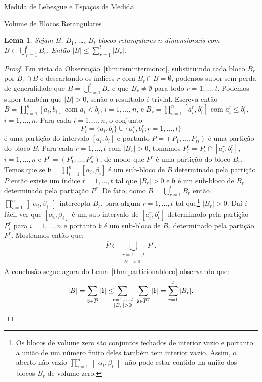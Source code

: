 \documentclass[oneside,final,11pt]{amsbook}
\theoremstyle{remark}\newtheorem{exercise}{Exercício}[chapter]
\theoremstyle{remark}\newtheorem{*exercise}[exercise]{\hbox to 0pt{\hskip 0pt minus 1fil*}Exercício}
\theoremstyle{definition}\newtheorem{exdefin}{Definição}[chapter]
\theoremstyle{plain}\newtheorem{teo}{Teorema}[section]
\theoremstyle{plain}\newtheorem{lem}[teo]{Lema}
\theoremstyle{plain}\newtheorem{prop}[teo]{Proposição}
\theoremstyle{plain}\newtheorem{cor}[teo]{Corolário}
\theoremstyle{definition}\newtheorem{defin}[teo]{Definição}
\theoremstyle{remark}\newtheorem{rem}[teo]{Observação}
\theoremstyle{definition}\newtheorem{notation}[teo]{Notação}
\theoremstyle{definition}\newtheorem{convention}[teo]{Convenção}
\theoremstyle{definition}\newtheorem{example}[teo]{Exemplo}
\numberwithin{section}{chapter}
\numberwithin{equation}{section}
\begin{document}
\begin{chapter}{Medida de Lebesgue e Espaços de Medida}
\begin{section}{Volume de Blocos Retangulares}
\begin{lem}\label{thm:dificilvolblocos}
Sejam $B$, $B_1$, \ldots, $B_t$ blocos retangulares $n$-dimensionais com $B\subset\bigcup_{r=1}^tB_r$. Então
$\vert B\vert\le\sum_{r=1}^t\vert B_r\vert$.
\end{lem}
\begin{proof}
Em vista da Observação~\ref{thm:remintermonot}, substituindo cada bloco $B_r$ por $B_r\cap B$ e descartando os índices
$r$ com $B_r\cap B=\emptyset$, podemos supor sem perda de generalidade que $B=\bigcup_{r=1}^tB_r$ e que $B_r\ne\emptyset$
para todo $r=1,\ldots,t$. Podemos supor também
que $\vert B\vert>0$, senão o resultado é trivial. Escreva então $B=\prod_{i=1}^n[a_i,b_i]$ com $a_i<b_i$, $i=1,\ldots,n$,
e $B_r=\prod_{i=1}^n[a_i^r,b_i^r]$ com $a_i^r\le b_i^r$, $i=1,\ldots,n$. Para cada $i=1,\ldots,n$, o conjunto
\[P_i=\{a_i,b_i\}\cup\{a_i^r,b_i^r;r=1,\ldots,t\}\]
é uma partição do intervalo $[a_i,b_i]$ e portanto $P=(P_1,\ldots,P_n)$
é uma partição do bloco $B$. Para cada $r=1,\ldots,t$ com $\vert B_r\vert>0$, tomamos $P_i^r=P_i\cap[a_i^r,b_i^r]$, $i=1,\ldots,n$ e $P^r=(P_1^r,\ldots,P_n^r)$,
de modo que $P^r$ é uma partição do bloco $B_r$. Temos que se $\mathfrak b=\prod_{i=1}^n[\alpha_i,\beta_i]$ é um sub-bloco de $B$
determinado pela partição $P$ então existe um índice $r=1,\ldots,t$ tal que $\vert B_r\vert>0$ e $\mathfrak b$ é um sub-bloco de $B_r$ determinado
pela partiação $P^r$. De fato, como $B=\bigcup_{r=1}^tB_r$ então $\prod_{i=1}^n\left]\alpha_i,\beta_i\right[$ intercepta
$B_r$, para algum $r=1,\ldots,t$ tal que\footnote{%
Os blocos de volume zero são conjuntos fechados de interior vazio e portanto a união de um número finito deles também tem interior vazio. Assim, o aberto
não vazio $\prod_{i=1}^n\left]\alpha_i,\beta_i\right[$ não pode estar contido na união dos blocos $B_r$ de volume zero.}
$\vert B_r\vert>0$. Daí é fácil ver que $[\alpha_i,\beta_i]$ é um sub-intervalo de $[a_i^r,b_i^r]$
determinado pela partição $P_i^r$ para $i=1,\ldots,n$ e portanto $\mathfrak b$ é um sub-bloco de $B_r$ determinado
pela partição $P^r$. Mostramos então que:
\[\overline P\subset\!\!\!\bigcup_{\substack{r=1,\ldots,t\\\vert B_r\vert>0}}\!\overline{P^r}.\]
A conclusão segue agora do Lema~\ref{thm:particionabloco} observando que:
\[\vert B\vert=\sum_{\mathfrak b\in\overline P}\vert\mathfrak b\vert\le\!\!\!\sum_{\substack{
r=1,\ldots,t\\\vert B_r\vert>0}}\;\sum_{\mathfrak b\in\overline{P^r}}\vert\mathfrak b\vert
=\sum_{r=1}^t\vert B_r\vert.\qedhere\]
\end{proof}


\end{section}
\end{chapter}
\end{document}
